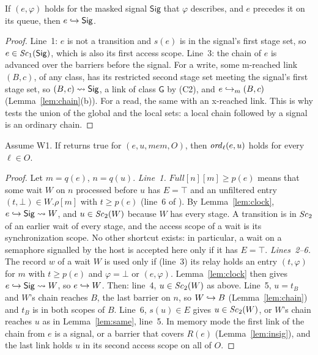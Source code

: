 \begin{lemma}\label{lem:insig}
If $(e,\varphi)$ holds for the masked signal $\mathsf{Sig}$ that $\varphi$ describes, and $e$ precedes it
on its queue, then $e \hookrightarrow \mathsf{Sig}$.
\end{lemma}
\begin{proof}
Line~1: $e$ is not a transition and $s(e)$ is in the signal's first stage set, so $e \in \mathit{Sc}_{1}(\mathsf{Sig})$, which is
also its first access scope. Line~3: the chain of $e$ is advanced over the barriers before the signal. For a write,
some m-reached link $(B,c)$, of any class, has its restricted second stage set meeting the signal's first stage set,
so $(B,c) \rightsquigarrow \mathsf{Sig}$, a link of class $\mathsf{G}$ by (C2), and $e \hookrightarrow_m (B,c)$
(Lemma~\ref{lem:chain}(b)). For a read, the same with an x-reached link. This is why  tests the union of
the global and the local sets: a local chain followed by a signal is an ordinary chain.
\end{proof}

\begin{lemma}[Waits]\label{lem:viawait}
Assume W1. If  returns true for $(e,u,\mathit{mem},O)$, then $\mathit{ord}_{\ell}(e,u)$ holds for every $\ell \in
O$.
\end{lemma}
\begin{proof}
Let $m = q(e)$, $n = q(u)$. \emph{Line~1.} $\mathit{Full}[n][m] \ge p(e)$ means that some wait $W$ on $n$ processed
before $u$ has $E = \top$ and an unfiltered entry $(t, \bot) \in W.\rho[m]$ with $t \ge p(e)$ (line~6 of ).
By Lemma~\ref{lem:clock}, $e \hookrightarrow \mathsf{Sig} \rightsquigarrow W$, and $u \in \mathit{Sc}_{2}(W)$ because $W$ has every stage. A
transition is in $\mathit{Sc}_{2}$ of an earlier wait of every stage, and the access scope of a wait is its synchronization
scope. No other shortcut exists: in particular, a wait on a semaphore signalled by the host is accepted here only if
it has $E = \top$. \emph{Lines~2--6.} The record $w$ of a wait $W$ is used only if (line~3) its relay holds an entry
$(t,\varphi)$ for $m$ with $t \ge p(e)$ and $\varphi = \bot$ or $(e,\varphi)$. Lemma~\ref{lem:clock}
then gives $e \hookrightarrow \mathsf{Sig} \rightsquigarrow W$, so $e \hookrightarrow W$. Then: line~4, $u \in \mathit{Sc}_{2}(W)$ as above. Line~5, $u =
t_B$ and $W$'s chain reaches $B$, the last barrier on $n$, so $W \hookrightarrow B$ (Lemma~\ref{lem:chain}) and $t_B$ is in both
scopes of $B$. Line~6, $s(u) \in E$ gives $u \in \mathit{Sc}_{2}(W)$, or $W$'s chain reaches $u$ as in Lemma~\ref{lem:same},
line~5. In memory mode the first link of the chain from $e$ is a signal, or a barrier that covers $R(e)$
(Lemma~\ref{lem:insig}), and the last link holds $u$ in its second access scope on all of $O$.
\end{proof}

